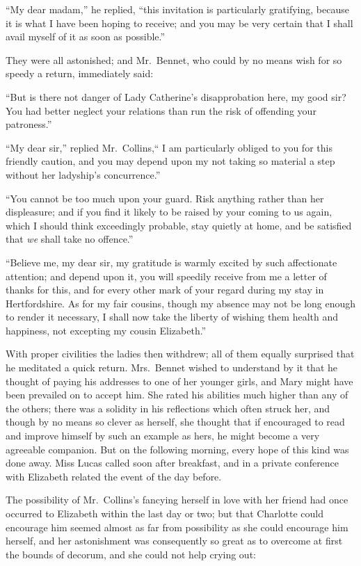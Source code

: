 ``My dear madam,'' he replied, ``this invitation is particularly
gratifying, because it is what I have been hoping to receive; and
you may be very certain that I shall avail myself of it as soon
as possible.''

They were all astonished; and Mr.\ Bennet, who could by no
means wish for so speedy a return, immediately said:

``But is there not danger of Lady Catherine's disapprobation
here, my good sir?  You had better neglect your relations than
run the risk of offending your patroness.''

``My dear sir,'' replied Mr.\ Collins,`` I am particularly obliged
to you for this friendly caution, and you may depend upon my not
taking so material a step without her ladyship's concurrence.''

``You cannot be too much upon your guard.  Risk anything
rather than her displeasure; and if you find it likely to be raised
by your coming to us again, which I should think exceedingly
probable, stay quietly at home, and be satisfied that \emph{we} shall
take no offence.''

``Believe me, my dear sir, my gratitude is warmly excited by
such affectionate attention; and depend upon it, you will speedily
receive from me a letter of thanks for this, and for every other
mark of your regard during my stay in Hertfordshire.  As for my
fair cousins, though my absence may not be long enough to
render it necessary, I shall now take the liberty of wishing them
health and happiness, not excepting my cousin Elizabeth.''

With proper civilities the ladies then withdrew; all of them
equally surprised that he meditated a quick return.  Mrs.\ Bennet
wished to understand by it that he thought of paying his
addresses to one of her younger girls, and Mary might have been
prevailed on to accept him.  She rated his abilities much higher
than any of the others; there was a solidity in his reflections
which often struck her, and though by no means so clever as
herself, she thought that if encouraged to read and improve
himself by such an example as hers, he might become a very
agreeable companion.  But on the following morning, every
hope of this kind was done away.  Miss Lucas called soon after
breakfast, and in a private conference with Elizabeth related the
event of the day before.

The possibility of Mr.\ Collins's fancying herself in love with her
friend had once occurred to Elizabeth within the last day or two;
but that Charlotte could encourage him seemed almost as far
from possibility as she could encourage him herself, and her
astonishment was consequently so great as to overcome at first
the bounds of decorum, and she could not help crying out:

